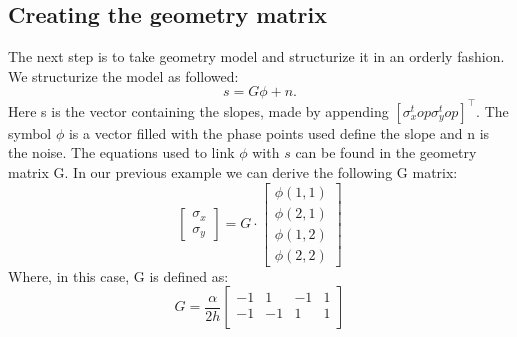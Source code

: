 \documentclass{article}
\begin{document}
\subsection{Creating the geometry matrix}
The next step is to take geometry model and structurize it in an orderly fashion. We structurize the model as followed:
$$ s = G\phi + n.$$  
Here s is the vector containing the slopes, made by appending $[\sigma_x^top \sigma_y^top]^\top$. The symbol $\phi$ is a vector filled with the phase points used define the slope and n is the noise. The equations used to link $\phi$ with $s$ can be found in the geometry matrix G. In our previous example we can derive the following G matrix:
$$ 
\begin{bmatrix}
\sigma_x \\
\sigma_y
\end{bmatrix} 
=
G
\cdot
\begin{bmatrix}
\phi(1,1) \\
\phi(2,1) \\
\phi(1,2) \\
\phi(2,2) 
\end{bmatrix}
$$
Where, in this case, G is defined as:
$$
G
=
\frac{\alpha}{2h}
\begin{bmatrix}
-1 & 1 & -1 & 1 \\
-1 & -1 & 1 & 1 \\
\end{bmatrix}
$$
\end{document}
